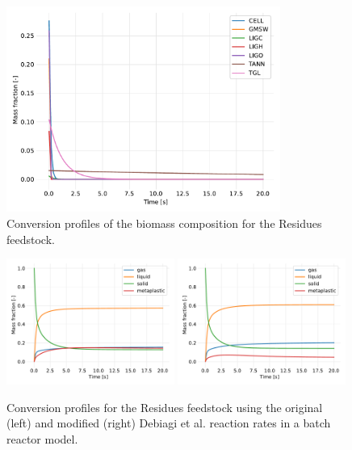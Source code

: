 \begin{figure}[H]
    \centering
    \includegraphics[width=0.8\textwidth]{figures/batch-biocomp.pdf}
    \caption{Conversion profiles of the biomass composition for the Residues feedstock.}
    \label{fig:batch-biocomp}
\end{figure}

\begin{figure}[H]
    \centering
    \includegraphics[width=0.49\textwidth]{figures/batch-products1.pdf}
    \includegraphics[width=0.49\textwidth]{figures/batch-products2.pdf}
    \caption{Conversion profiles for the Residues feedstock using the original (left) and modified (right) Debiagi et al. reaction rates in a batch reactor model.}
    \label{fig:batch-products}
\end{figure}

